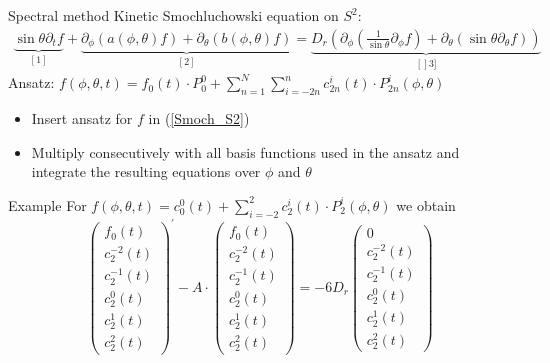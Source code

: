 \begin{frame}{Spectral method}
	\scriptsize
	Kinetic Smochluchowski equation on $S^2$:
	\begin{align}
		\underbrace{\sin \theta \partial_t f}_{[1]} + \underbrace{\partial_\phi\left(a(\phi, \theta) f\right)+\partial_\theta\left(b(\phi, \theta) f\right)}_{[2]} = \underbrace{D_r \left(\partial_\phi\left(\frac{1}{\sin \theta} \partial_\phi f\right)+\partial_\theta\left(\sin \theta \partial_\theta f\right)\right)}_{[]3]} \label{Smoch_S2}
	\end{align}	
	Ansatz: $f(\phi, \theta, t) = f_0(t) \cdot P_0^0 + \sum_{n=1}^{N} \sum_{i=-2n}^{n} c^i_{2n}(t) \cdot P^i_{2n}(\phi, \theta)$
 	\vspace{12pt}
 	\begin{itemize}
 		\item Insert ansatz for $f$ in (\ref{Smoch_S2}) 
 		\item Multiply consecutively with all basis functions used in the ansatz and integrate the resulting equations over $\phi$ and $\theta$
 	\end{itemize}
\end{frame}

\begin{frame}{Example}
	\scriptsize
	For  $f(\phi, \theta, t) = c^0_0(t) + \sum_{i=-2}^{2} c^i_{2}(t) \cdot P^i_{2}(\phi, \theta)$ we obtain
		\begin{equation}
		\left(\begin{array}{c}
			f_0(t) \\
			c_2^{-2}(t) \\
			c_2^{-1}(t) \\
			c_2^0(t) \\
			c_2^1(t) \\
			c_2^2(t)
		\end{array}\right)^{\prime} - A \cdot
		\left(\begin{array}{c}
			f_0(t) \\
			c_2^{-2}(t) \\
			c_2^{-1}(t) \\
			c_2^0(t) \\
			c_2^1(t) \\
			c_2^2(t)
		\end{array}\right) = -6 D_r
		\left(\begin{array}{c}
			0 \\
			c^{-2}_2(t) \\
			c_2^{-1}(t) \\
			c_2^0(t) \\
			c_2^1(t) \\
			c_2^2(t)
		\end{array}\right)
	\end{equation}
\end{frame}

